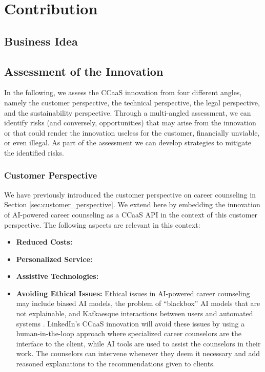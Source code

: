 \section{Contribution}
\label{sec:contribution}

\subsection{Business Idea}

\subsection{Assessment of the Innovation}

In the following, we assess the CCaaS innovation from four different angles, namely the customer perspective,
the technical perspective, the legal perspective, and the sustainability perspective. Through a multi-angled 
assessment, we can identify risks (and conversely, opportunities) that may arise from the innovation or that
could render the innovation useless for the customer, financially unviable, or even illegal. As part of the
assessment we can develop strategies to mitigate the identified risks.

\subsubsection{Customer Perspective}

We have previously introduced the customer perspective on career counseling in Section \ref{sec:customer_perspective}.
We extend here by embedding the innovation of AI-powered career counseling as a CCaaS API in the context of this 
customer perspective. The following aspects are relevant in this context:

\begin{itemize}
    \item \textbf{Reduced Costs:}
    \item \textbf{Personalized Service:}
    \item \textbf{Assistive Technologies:}
    \item \textbf{Avoiding Ethical Issues:} Ethical issues in AI-powered career counseling may include biased AI
        models, the problem of ``blackbox'' AI models that are not explainable, and Kafkaesque interactions between
        users and automated systems \citep{kaserAIpoweredCareerCounseling2023}. LinkedIn's CCaaS innovation will avoid 
        these issues by using a human-in-the-loop approach where specialized career counselors are the interface 
        to the client, while AI tools are used to assist the counselors in their work. The counselors can intervene
        whenever they deem it necessary and add reasoned explanations to the recommendations given to clients.
\end{itemize}


